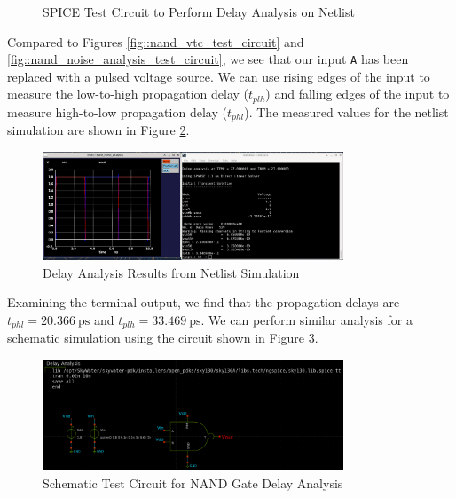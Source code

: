 \documentclass{article}
\begin{document}
	\begin{figure}[H]	
		\caption{SPICE Test Circuit to Perform Delay Analysis on Netlist}
		\label{fig::nand_delay_analysis_test_circuit}
	\end{figure}
	
	\noindent Compared to Figures \ref{fig::nand_vtc_test_circuit} and \ref{fig::nand_noise_analysis_test_circuit}, we see that our input \texttt{A} has been replaced with a pulsed voltage source. We can use rising edges of the input to measure the low-to-high propagation delay ($t_{plh}$) and falling edges of the input to measure high-to-low propagation delay ($t_{phl}$). The measured values for the netlist simulation are shown in Figure \ref{fig::nand_delay_analysis}.
	
	\begin{figure}[H]
		\centerline{\includegraphics[width=0.8\textwidth]{nand_delay_analysis.png}}
		\caption{Delay Analysis Results from Netlist Simulation}
		\label{fig::nand_delay_analysis}
	\end{figure}
	
	\noindent Examining the terminal output, we find that the propagation delays are $t_{phl} = 20.366\ \text{ps}$ and $t_{plh} = 33.469\ \text{ps}$. We can perform similar analysis for a schematic simulation using the circuit shown in Figure \ref{fig::nand_delay_analysis_test_circuit_schem}.
	
	\begin{figure}[H]
		\centerline{\includegraphics[width=0.8\textwidth]{nand_delay_analysis_test_circuit.png}}
		\caption{Schematic Test Circuit for NAND Gate Delay Analysis}
		\label{fig::nand_delay_analysis_test_circuit_schem}
	\end{figure}
	
\end{document}

